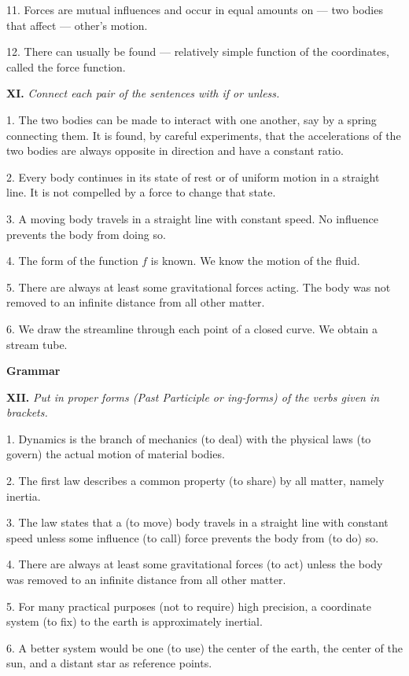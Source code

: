 \documentclass[a4paper]{article}
\newcommand{\ESect}[1]{\medskip\par{\large \textbf{#1}}\par}
\newcommand{\ETask}[2]{\medskip\par\textbf{#1.} \textit{#2}\par}
\begin{document}
11. Forces are mutual influences and occur in equal amounts on --- two bodies that affect --- other's motion.

12. There can usually be found --- relatively simple function of the coordinates, called the force function.

\ETask{XI}{Connect each pair of the sentences with if or unless.}

1. The two bodies can be made to interact with one another, say by a spring connecting them. It is found, by careful experiments,
that the accelerations of the two bodies are always opposite in direction and have a constant ratio.

2. Every body continues in its state of rest or of uniform motion in a straight line. It is not compelled by a force to
change that state.

3. A moving body travels in a straight line with constant speed. No influence prevents the body from doing so.

4. The form of the function $f$ is known. We know the motion of the fluid.

5. There are always at least some gravitational forces acting. The body was not removed to an infinite distance from all
other matter.

6. We draw the streamline through each point of a closed curve. We obtain a stream tube.

\ESect{Grammar}

\ETask{XII}{Put in proper forms (Past Participle or ing-forms) of the verbs given in brackets.}

1. Dynamics is the branch of mechanics (to deal) with the physical laws (to govern) the actual motion of material bodies.

2. The first law describes a common property (to share) by all matter, namely inertia.

3. The law states that a (to move) body travels in a straight line with constant speed unless some influence (to call) force
prevents the body from (to do) so.

4. There are always at least some gravitational forces (to act) unless the body was removed to an infinite distance from
all other matter.

5. For many practical purposes (not to require) high precision, a coordinate system (to fix) to the earth is approximately inertial.

6. A better system would be one (to use) the center of the earth, the center of the sun, and a distant star as reference points.
\end{document}
